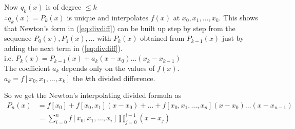 \documentclass[12pt,class=book,crop=false]{standalone}
\begin{document}
Now \(  q_k(x) \) is of degree \(  \leq k \)\\
\(  \therefore q_k(x)=P_k(x) \) is unique and interpolates \(  f(x) \) at \(  x_0,x_1,\dots,x_k  \). This shows that Newton's form in (\ref{eq:divdiff}) can be built up step by step from the sequence \(  P_0(x),P_1(x),\dots \) with \(  P_k(x) \) obtained from \(  P_{k-1}(x) \) just by adding the next term in (\ref{eq:divdiff}).\\
i.e. \(  P_k(x)=P_{k-1}(x)+a_k(x-x_0)\dots (x_k-x_{k-1}) \)\\
The coefficient \(  a_k \) depends only on the values of \(  f(x) \).\\
\indent \(  a_k=f[x_0,x_1,\dots,x_k] \) the \(  k \)th divided difference.

So we get the Newton's interpolating divided formula as
\begin{align*}
    P_n(x) & =f[x_0]+f[x_0,x_1](x-x_0)+\dots+f[x_0,x_1,\dots,x_n](x-x_0)\dots(x-x_{n-1}) \\
           & =\sum_{i=0}^nf[x_0,x_1,\dots,x_i]\prod_{j=0}^{i-1}(x-x_j)
\end{align*}
\end{document}
